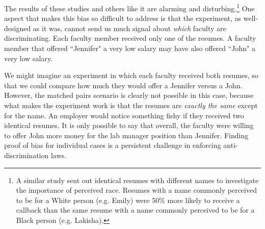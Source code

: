 The results of these studies and others like it are alarming and disturbing.\footnote{A similar study sent out identical resumes with different names to investigate the importance of perceived race.  Resumes with a name commonly perceived to be for a White person (e.g. Emily) were 50\% more likely to receive a callback than the same resume with a name commonly perceived to be for a Black person (e.g. Lakisha).  }   One aspect that makes this bias so difficult to address is that the experiment, as well-designed as it was, cannot send us much signal about \emph{which} faculty are
discriminating.  Each faculty member received only one of the resumes.  A faculty member that offered ``Jennifer" a very low salary may have also offered ``John" a very low salary.  

We might imagine an experiment in which each faculty received both resumes, so that we could compare how much they would offer a Jennifer versus a John.  However, the matched pairs scenario is clearly not possible in this case, because what makes the experiment work is that the resumes are \emph{exactly the same} except for the name. An employer would notice something fishy if they received two identical resumes.  It is only possible to say that overall, the faculty were willing to offer John more money for the lab manager position than Jennifer.  Finding proof of bias for individual cases is a persistent challenge in enforcing anti-discrimination laws.

\D{\newpage}

